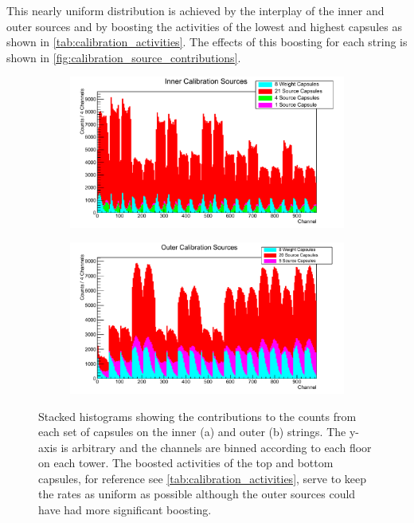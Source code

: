 This nearly uniform distribution is achieved by the interplay of the inner and outer sources and by boosting the activities of the lowest and highest capsules as shown in \autoref{tab:calibration_activities}.
The effects of this boosting for each string is shown in \autoref{fig:calibration_source_contributions}.
\begin{figure}[htbp]
\centering
\begin{subfigure}[t]{0.9\textwidth}
\centering
\includegraphics[width=\textwidth]{Figures/InnerCalibrationSources.pdf}
\caption{}
\label{fig:inner_calibration_sources}
\end{subfigure}
\qquad
\begin{subfigure}[t]{0.9\textwidth}
\centering
\includegraphics[width=\textwidth]{Figures/OuterCalibrationSources.pdf}
\caption{}
\label{fig:outer_calibration_sources}
\end{subfigure}
\caption[Stacked histograms showing the contributions to the counts from each set of capsules on the inner (a) and outer (b) strings]
{Stacked histograms showing the contributions to the counts from each set of capsules on the inner (a) and outer (b) strings.
The y-axis is arbitrary and the channels are binned according to each floor on each tower.
The boosted activities of the top and bottom capsules, for reference see \autoref{tab:calibration_activities}, serve to keep the rates as uniform as possible although the outer sources could have had more significant boosting.}
\label{fig:calibration_source_contributions}
\end{figure}
